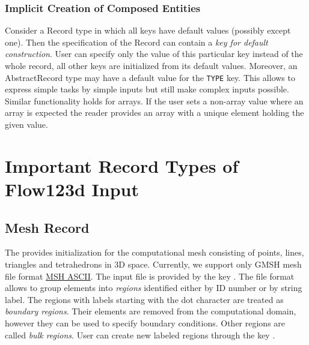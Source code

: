 \subsubsection{Implicit Creation of Composed Entities}
Consider a Record type in which all keys have default values (possibly except one). Then the specification
of the Record can contain a {\it key for default construction}. User can specify only the value of this particular key instead of the whole record, all other keys are initialized from its default values.
Moreover, an AbstractRecord type may have a default value for the \verb'TYPE' key.
This allows to express simple tasks by simple inputs but still make complex inputs possible. 
Similar functionality holds for arrays. If the user sets a non-array value where an array is expected the reader provides an array with a unique element holding the given value.


\section{Important Record Types of Flow123d Input}


\subsection{Mesh Record}
\label{sec:Mesh}
The  provides initialization for the computational mesh consisting of points, lines, triangles and tetrahedrons in 3D space.
Currently, we support only GMSH mesh file format \href{http://geuz.org/gmsh/doc/texinfo/gmsh.html#MSH-ASCII-file-format}{MSH ASCII}. 
The input file is provided by the key . The file format allows to group elements into {\it regions} identified either by ID number or by string label. 
The regions with labels starting with the dot character are treated as {\it boundary regions}. Their elements are removed from the computational domain, however they can be used to specify boundary
conditions. Other regions are called {\it bulk regions}. User can create new labeled regions through the key 
. 


